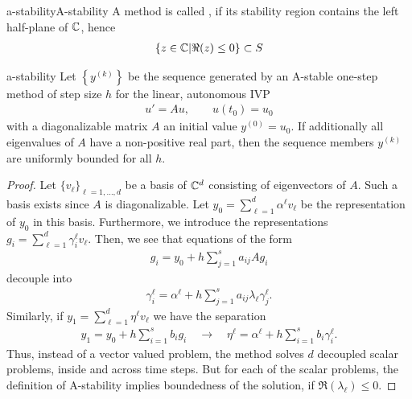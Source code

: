\begin{Definition*}{a-stability}{A-stability}
  A method is called , if its stability region contains
  the left half-plane of $\mathbb C$, hence
  \begin{gather}
    \{ z \in \mathbb C | \Re(z) \le 0 \} \subset S
  \end{gather}
\end{Definition*}

\begin{Theorem}{a-stability}
  Let $\left\{y^{(k)}\right\}$ be the sequence generated by an
  A-stable one-step method of step size $h$ for the linear, autonomous IVP
  \begin{gather*}
    u'=Au, \qquad u(t_0) = u_0
  \end{gather*}
  with a diagonalizable matrix $A$ an initial value $y^{(0)} =
  u_0$. If additionally all eigenvalues of $A$ have a non-positive
  real part, then the sequence members $y^{(k)}$ are uniformly bounded
  for all $h$.
\end{Theorem}


\begin{proof}
  Let $\{v_\ell\}_{\ell=1,\dots,d}$ be a basis of $\mathbb C^d$ consisting of
  eigenvectors of $A$. Such a basis exists since $A$ is
  diagonalizable. Let $y_0 = \sum_{\ell=1}^d \alpha^\ell v_\ell$ be
  the representation of $y_0$ in this basis. Furthermore, we introduce
  the representations $g_i = \sum_{\ell=1}^d \gamma_i^\ell
  v_\ell$. Then, we see that equations of the form
  \begin{gather*}
    g_i = y_0 + h \sum_{j=1}^s a_{ij} A g_i
  \end{gather*}
  decouple into
  \begin{gather*}
    \gamma_{i}^\ell = \alpha^\ell + h \sum_{j=1}^s a_{ij} \lambda_\ell \gamma_j^\ell.
  \end{gather*}
  Similarly, if $y_1 = \sum_{\ell=1}^d \eta^\ell v_\ell$ we have the separation
  \begin{gather*}
    y_1 = y_0 + h\sum_{i=1}^s b_i g_i
    \quad\longrightarrow\quad
    \eta^\ell = \alpha^\ell  + h\sum_{i=1}^s b_i \gamma_i^\ell.
  \end{gather*}
  Thus, instead of a vector valued problem, the method solves $d$
  decoupled scalar problems, inside and across time steps. But for each of the scalar problems, the definition of A-stability implies boundedness of the solution, if $\Re(\lambda_\ell) \le 0$.
\end{proof}

